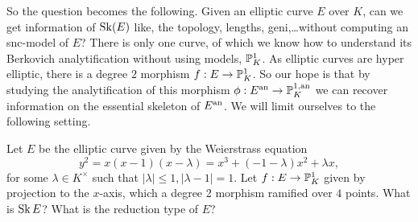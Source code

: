 So the question becomes the following. Given an elliptic curve $E$ over $K$, can we get information of $\operatorname{Sk}(E)$ like, the topology, lengths, geni,\ldots without computing an snc-model of  $E$?
There is only one curve, of which we know how to understand its Berkovich analytification without using models, $\mathbb{P}^{1}_K$.
As elliptic curves are hyper elliptic, there is a degree $2$ morphism $f: E \to \mathbb{P}^{1}_K$. 
So our hope is that by studying the analytification of this morphism $\phi: E{}^{\text{an}} \to \mathbb{P}^{1, \text{an}}_K$ we can recover information on the essential skeleton of $E{}^{\text{an}}$. 
We will limit ourselves to the following setting.
\begin{problem}\label{prob:main_problem}
	Let $E$ be the elliptic curve given by the Weierstrass equation 
	\begin{equation}\label{eq:weierstrass_problem}
		y^2 = x(x-1)(x-\lambda) = x^3 + (-1 - \lambda) x^2 + \lambda x
	,\end{equation}
	for some $\lambda \in K^\times $ such that $|\lambda| \le 1, |\lambda - 1| = 1$. 
	Let $f: E \to \mathbb{P}^{1}_K$ given by projection to the $x$-axis, which a degree 2 morphism ramified over $4$ points. 
	What is $\operatorname{Sk} E$? What is the reduction type of $E$?
\end{problem}
\setlength{\LTcapwidth}{5.7in}
